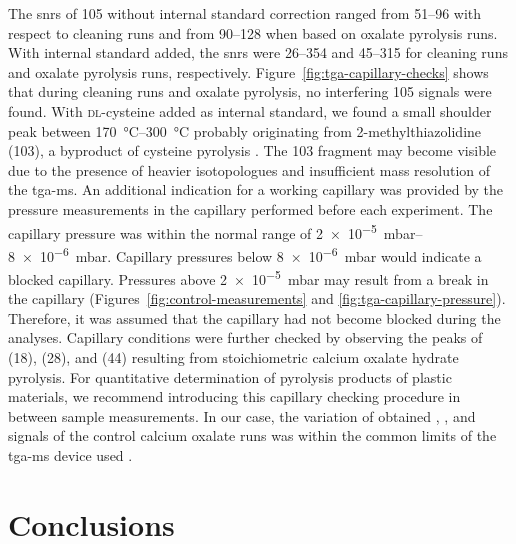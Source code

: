 The \acp{snr} of \SI{105}{\mz} without internal standard correction ranged from \numrange[range-phrase = { to }]{51}{96} with respect to cleaning runs and from \numrange[range-phrase = { to }]{90}{128} when based on oxalate pyrolysis runs.
With internal standard added, the \acp{snr} were \numrange{26}{354} and \numrange{45}{315} for cleaning runs and oxalate pyrolysis runs, respectively. Figure~\ref{fig:tga-capillary-checks} shows that during cleaning runs and oxalate pyrolysis, no interfering \SI{105}{\mz} signals were found. With \textsc{dl}-cysteine added as internal standard, we found a small shoulder peak between \SIrange[range-phrase = { and }]{170}{300}{\degreeCelsius} probably originating from 2-methylthiazolidine (\SI{103}{\mz}), a byproduct of cysteine pyrolysis \citep{FujimakiPyrolysis1969}.
The \SI{103}{\mz} fragment may become visible due to the presence of heavier isotopologues and insufficient mass resolution of the \ac{tga-ms}. An additional indication for a working capillary was provided by the pressure measurements in the capillary performed before each experiment. The capillary pressure was within the normal range of \SIrange[range-phrase = { to }]{2e-5}{8e-6}{\milli\bar}.
Capillary pressures below \SI{8e-6}{\milli\bar} would indicate a blocked capillary. Pressures above \SI{2e-5}{\milli\bar} may result from a break in the capillary (Figures~\ref{fig:control-measurements} and \ref{fig:tga-capillary-pressure}). Therefore, it was assumed that the capillary had not become blocked during the analyses. Capillary conditions were further checked by observing the peaks of  (\SI{18}{\mz}),  (\SI{28}{\mz}), and  (\SI{44}{\mz}) resulting from stoichiometric calcium oxalate hydrate pyrolysis.
For quantitative determination of pyrolysis products of plastic materials, we recommend introducing this capillary checking procedure
in between sample measurements. In our case, the variation of obtained , , and  signals of the control calcium oxalate runs was within the common limits of the \ac{tga-ms} device used \citep{NetzschGeratebauMS2010}.

\section{Conclusions}

